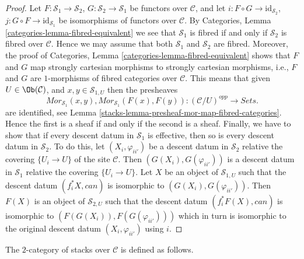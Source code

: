 \begin{proof}

Let $F : \mathcal{S}_1 \to \mathcal{S}_2$,
$G : \mathcal{S}_2 \to \mathcal{S}_1$ be functors over $\mathcal{C}$, and let
$i : F \circ G \to \text{id}_{\mathcal{S}_2}$,
$j : G \circ F \to \text{id}_{\mathcal{S}_1}$ be isomorphisms of
functors over $\mathcal{C}$. By
Categories, Lemma \ref{categories-lemma-fibred-equivalent}
we see that $\mathcal{S}_1$ is fibred if and only if $\mathcal{S}_2$
is fibred over $\mathcal{C}$. Hence we may assume that both
$\mathcal{S}_1$ and $\mathcal{S}_2$ are fibred. Moreover, the proof of
Categories, Lemma \ref{categories-lemma-fibred-equivalent}
shows that $F$ and $G$ map strongly cartesian morphisms to strongly
cartesian morphisms, i.e., $F$ and $G$ are $1$-morphisms of fibred
categories over $\mathcal{C}$. This means that given
$U \in \Ob(\mathcal{C})$, and $x, y \in \mathcal{S}_{1, U}$ then
the presheaves
$$
\mathit{Mor}_{\mathcal{S}_1}(x, y),
\mathit{Mor}_{\mathcal{S}_1}(F(x), F(y)) :
(\mathcal{C}/U)^{opp} \longrightarrow \textit{Sets}.
$$
are identified, see
Lemma \ref{stacks-lemma-presheaf-mor-map-fibred-categories}. Hence
the first is a sheaf if and only if the second is a sheaf.
Finally, we have to show that if every descent datum in $\mathcal{S}_1$
is effective, then so is every descent datum in $\mathcal{S}_2$.
To do this, let $(X_i, \varphi_{ii'})$ be a descent datum
in $\mathcal{S}_2$ relative the covering $\{U_i \to U\}$ of the site
$\mathcal{C}$. Then $(G(X_i), G(\varphi_{ii'}))$ is a descent datum
in $\mathcal{S}_1$ relative the covering $\{U_i \to U\}$.
Let $X$ be an object of $\mathcal{S}_{1, U}$ such that the
descent datum $(f_i^*X, can)$ is isomorphic to
$(G(X_i), G(\varphi_{ii'}))$. Then $F(X)$ is an object of $\mathcal{S}_{2, U}$
such that the descent datum $(f_i^*F(X), can)$ is isomorphic to
$(F(G(X_i)), F(G(\varphi_{ii'})))$ which in turn is isomorphic to
the original descent datum $(X_i, \varphi_{ii'})$ using $i$.
\end{proof}

The $2$-category of stacks over $\mathcal{C}$
is defined as follows.

